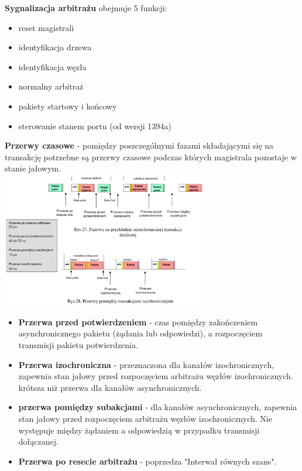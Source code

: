 \textbf{Sygnalizacja arbitrażu} obejmuje 5 funkcji:
\begin{itemize}
	\item reset magistrali
	\item identyfikacja drzewa
	\item identyfikacja węzła
	\item normalny arbitraż
	\item pakiety startowy i końcowy
	\item sterowanie stanem portu (od wersji 1394a)
\end{itemize}
\textbf{Przerwy czasowe} - pomiędzy poszczególnymi fazami składającymi się na transakcję potrzebne są przerwy czasowe podczas których magistrala pozostaje w stanie jałowym.\\
\includegraphics[width=9cm]{./wyklady/FIREWIRE_29_1.pdf}\\
\begin{itemize}
	\item \textbf{Przerwa przed potwierdzeniem} - czas pomiędzy zakończeniem asynchronicznego pakietu (żądania lub odpowiedzi), a rozpoczęciem transmisji pakietu potwierdzenia.
	\item \textbf{Przerwa izochroniczna} - przeznaczona dla kanałów izochronicznych, zapewnia stan jałowy przed rozpoczęciem arbitrażu węzłów izochronicznych. krótsza niż przerwa dla kanałów asynchronicznych.
	\item \textbf{przerwa pomiędzy subakcjami} - dla kanałów asynchronicznych, zapewnia stan jałowy przed rozpoczęciem arbitrażu węzłów izochronicznych. Nie występuje między żądaniem a odpowiedzią w przypadku transmisji dołączanej.
	\item \textbf{Przerwa po resecie arbitrażu} - poprzedza "Interwał równych szans".
\end{itemize}

